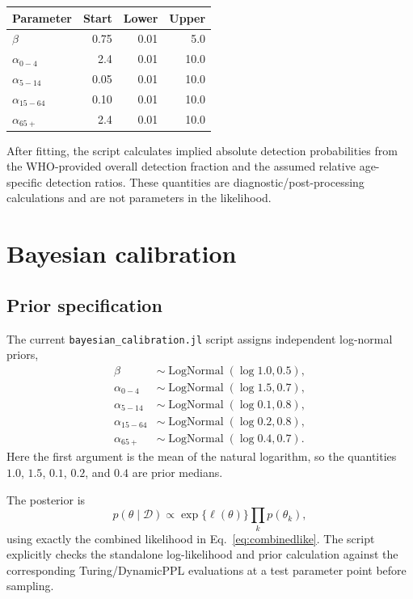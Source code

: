 \documentclass[11pt]{article}
\newcommand{\code}[1]{\texttt{#1}}
\begin{document}
\begin{center}
\begin{tabular}{lrrr}
\toprule
Parameter & Start & Lower & Upper\\
\midrule
$\beta$ & 0.75 & 0.01 & 5.0\\
$\alpha_{0-4}$ & 2.4 & 0.01 & 10.0\\
$\alpha_{5-14}$ & 0.05 & 0.01 & 10.0\\
$\alpha_{15-64}$ & 0.10 & 0.01 & 10.0\\
$\alpha_{65+}$ & 2.4 & 0.01 & 10.0\\
\bottomrule
\end{tabular}
\end{center}

After fitting, the script calculates implied absolute detection probabilities from the WHO-provided overall detection fraction and the assumed relative age-specific detection ratios. These quantities are diagnostic/post-processing calculations and are not parameters in the likelihood.

\section{Bayesian calibration}

\subsection{Prior specification}

The current \code{bayesian\_calibration.jl} script assigns independent log-normal priors,
\begin{align}
\beta &\sim \operatorname{LogNormal}(\log 1.0,0.5),\\
\alpha_{0-4} &\sim \operatorname{LogNormal}(\log 1.5,0.7),\\
\alpha_{5-14} &\sim \operatorname{LogNormal}(\log 0.1,0.8),\\
\alpha_{15-64} &\sim \operatorname{LogNormal}(\log 0.2,0.8),\\
\alpha_{65+} &\sim \operatorname{LogNormal}(\log 0.4,0.7).
\label{eq:priors}
\end{align}
Here the first argument is the mean of the natural logarithm, so the quantities $1.0$, $1.5$, $0.1$, $0.2$, and $0.4$ are prior medians.

The posterior is
\begin{equation}
p(\theta\mid\mathcal D)\propto
\exp\{\ell(\theta)\}\prod_kp(\theta_k),
\end{equation}
using exactly the combined likelihood in Eq.~\eqref{eq:combinedlike}. The script explicitly checks the standalone log-likelihood and prior calculation against the corresponding Turing/DynamicPPL evaluations at a test parameter point before sampling.
\end{document}
